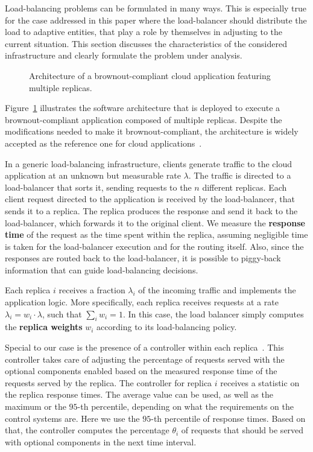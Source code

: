 Load-balancing problems can be formulated in many ways. This is
especially true for the case addressed in this paper where the
load-balancer should distribute the load to adaptive entities, that
play a role by themselves in adjusting to the current situation. This
section discusses the characteristics of the considered infrastructure
and clearly formulate the problem under analysis.

\begin{figure}[t]
  \centering 
   
  \caption{Architecture of a brownout-compliant cloud application
    featuring multiple replicas.}
  \label{fig:architecture}
\end{figure}

Figure~\ref{fig:architecture} illustrates the software architecture
that is deployed to execute a brownout-compliant application composed
of multiple replicas. Despite the modifications needed to make it
brownout-compliant, the architecture is widely accepted as the
reference one for cloud applications~\citep{Barroso09}.

In a generic load-balancing infrastructure, clients generate traffic
to the cloud application at an unknown but measurable rate
$\lambda$. The traffic is directed to a load-balancer that sorts it,
sending requests to the $n$ different replicas. Each client request
directed to the application is received by the load-balancer, that
sends it to a replica. The replica produces the response and send it
back to the load-balancer, which forwards it to the original
client. We measure the \textbf{response time} of the request as the
time spent within the replica, assuming negligible time is taken for
the load-balancer execution and for the routing itself. Also, since
the responses are routed back to the load-balancer, it is possible to
piggy-back information that can guide load-balancing decisions.

Each replica $i$ receives a fraction $\lambda_i$ of the incoming
traffic and implements the application logic. More specifically, each
replica receives requests at a rate $\lambda_i = w_i \cdot \lambda$,
such that $\sum_{i} w_i = 1$. In this case, the load balancer simply
computes the \textbf{replica weights} $w_i$ according to its
load-balancing policy.

Special to our case is the presence of a controller within each
replica~\cite{cloudish-tr}. This controller takes care of adjusting
the percentage of requests served with the optional components enabled
based on the measured response time of the requests served by the
replica. The controller for replica $i$ receives a statistic on the
replica response times. The average value can be used, as well as the 
maximum or the $95$-th percentile, depending on what the requirements 
on the control systems are. Here we use the $95$-th percentile of
response times. Based on that, the controller computes the percentage 
$\theta_i$ of requests that should be served with optional components 
in the next time interval.

